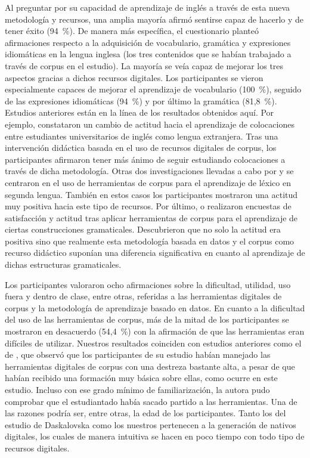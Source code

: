 Al preguntar por su capacidad de aprendizaje de inglés a través de esta
nueva metodología y recursos, una amplia mayoría afirmó sentirse capaz
de hacerlo y de tener éxito (94~\%). De manera más específica, el
cuestionario planteó afirmaciones respecto a la adquisición de
vocabulario, gramática y expresiones idiomáticas en la lengua inglesa
(los tres contenidos que se habían trabajado a través de corpus en el
estudio). La mayoría se veía capaz de mejorar los tres aspectos gracias
a dichos recursos digitales. Los participantes se vieron especialmente
capaces de mejorar el aprendizaje de vocabulario (100~\%), seguido de
las expresiones idiomáticas (94~\%) y por último la gramática (81,8~\%).
Estudios anteriores están en la línea de los resultados obtenidos aquí.
Por ejemplo, \textcite{saeedakhtar2020effect} constataron un cambio de
actitud hacia el aprendizaje de colocaciones entre estudiantes
universitarios de inglés como lengua extranjera. Tras una intervención
didáctica basada en el uso de recursos digitales de corpus, los
participantes afirmaron tener más ánimo de seguir estudiando
colocaciones a través de dicha metodología. Otras dos investigaciones
llevadas a cabo por \textcite{yao2019vocabulary} y \textcite{sinha2021efl} se centraron en el uso de
herramientas de corpus para el aprendizaje de léxico en segunda lengua.
También en estos casos los participantes mostraron una actitud muy
positiva hacia este tipo de recursos. Por último, \textcite{charles2014getting} o
\textcite{guilquin2021using} realizaron encuestas de satisfacción y actitud tras
aplicar herramientas de corpus para el aprendizaje de ciertas
construcciones gramaticales. Descubrieron que no solo la actitud era
positiva sino que realmente esta metodología basada en datos y el corpus
como recurso didáctico suponían una diferencia significativa en cuanto
al aprendizaje de dichas estructuras gramaticales.

Los participantes valoraron ocho afirmaciones sobre la dificultad,
utilidad, uso fuera y dentro de clase, entre otras, referidas a las
herramientas digitales de corpus y la metodología de aprendizaje basado
en datos. En cuanto a la dificultad del uso de las herramientas de
corpus, más de la mitad de los participantes se mostraron en desacuerdo
(54,4~\%) con la afirmación de que las herramientas eran difíciles de
utilizar. Nuestros resultados coinciden con estudios anteriores como el
de \textcite{daskalovska2015corpus}, que observó que los participantes de su estudio
habían manejado las herramientas digitales de corpus con una destreza
bastante alta, a pesar de que habían recibido una formación muy básica
sobre ellas, como ocurre en este estudio. Incluso con ese grado mínimo
de familiarización, la autora pudo comprobar que el estudiantado había
sacado partido a las herramientas. Una de las razones podría ser, entre
otras, la edad de los participantes. Tanto los del estudio de
Daskalovska como los nuestros pertenecen a la generación de nativos
digitales, los cuales de manera intuitiva se hacen en poco tiempo con
todo tipo de recursos digitales.

